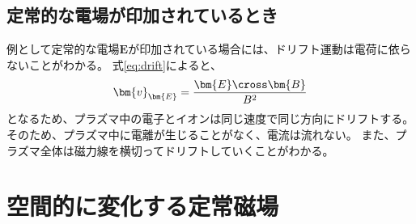 \subsection{定常的な電場が印加されているとき}
例として定常的な電場$\bm{E}$が印加されている場合には、ドリフト運動は電荷に依らないことがわかる。
式\eqref{eq:drift}によると、
\begin{equation}
	\bm{v}_{\bm{E}} = \frac{\bm{E}\cross\bm{B}}{B^2}
\end{equation}
となるため、プラズマ中の電子とイオンは同じ速度で同じ方向にドリフトする。そのため、プラズマ中に電離が生じることがなく、電流は流れない。
また、プラズマ全体は磁力線を横切ってドリフトしていくことがわかる。

\newpage
\section{空間的に変化する定常磁場}
